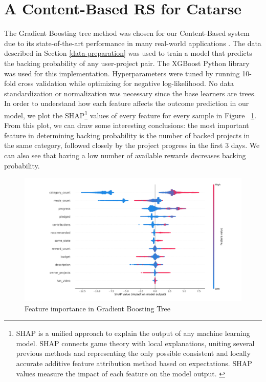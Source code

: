 \documentclass[cic,tc,english]{iiufrgs}
\newcommand{\adriano}[1]{#1}
\begin{document}
\section{A Content-Based RS for Catarse}

The Gradient Boosting tree method was chosen for our Content-Based system due to its state-of-the-art performance in many real-world applications \cite{Chen2016}. The data described in Section \ref{data-preparation} was used to train a model that predicts the backing probability of any user-project pair. The XGBoost Python library was used for this implementation. Hyperparameters were tuned by running 10-fold cross validation while optimizing for negative log-likelihood. No data standardization or normalization was necessary since the base learners are trees. In order to understand how each feature affects the outcome prediction in our model, we plot the SHAP\footnote{SHAP is a unified approach to explain the output of any machine learning model. SHAP connects game theory with local explanations, uniting several previous methods and representing the only possible consistent and locally accurate additive feature attribution method based on expectations. \adriano{SHAP values measure the impact of each feature on the model output.  \cite{Lundberg2017}}} values of every feature for every sample in Figure ~\ref{fig:features_importance}. From this plot, we can draw some interesting conclusions: the most important feature in determining backing probability is the number of backed projects in the same category, followed closely by the project progress in the first 3 days. We can also see that having a low number of available rewards decreases backing probability.

\begin{figure}[ht!]
    \caption{Feature importance in Gradient Boosting Tree}
    \begin{center}
        \includegraphics[width=\textwidth]{feature_contribution}
    \end{center}
    \label{fig:features_importance}
\end{figure}
\end{document}
